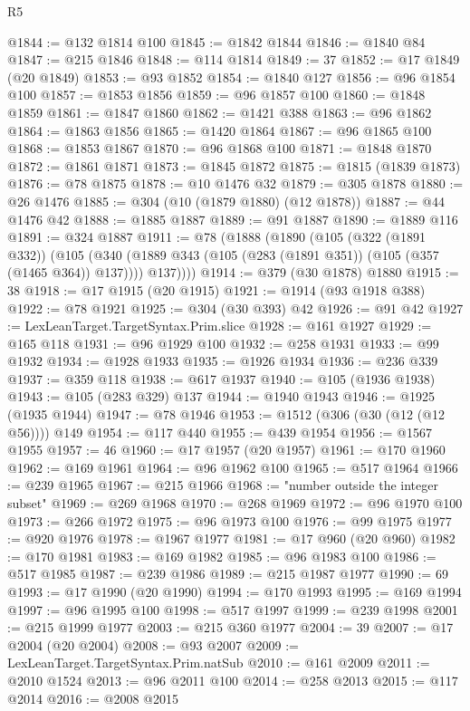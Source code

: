 \begin{lexlean}{R5}
\begin{coremodule}
@1844 := @132 @1814 @100
@1845 := @1842 @1844
@1846 := @1840 @84
@1847 := @215 @1846
@1848 := @114 @1814
@1849 := 37
@1852 := @17 @1849 (@20 @1849)
@1853 := @93 @1852
@1854 := @1840 @127
@1856 := @96 @1854 @100
@1857 := @1853 @1856
@1859 := @96 @1857 @100
@1860 := @1848 @1859
@1861 := @1847 @1860
@1862 := @1421 @388
@1863 := @96 @1862
@1864 := @1863 @1856
@1865 := @1420 @1864
@1867 := @96 @1865 @100
@1868 := @1853 @1867
@1870 := @96 @1868 @100
@1871 := @1848 @1870
@1872 := @1861 @1871
@1873 := @1845 @1872
@1875 := @1815 (@1839 @1873)
@1876 := @78 @1875
@1878 := @10 @1476 @32
@1879 := @305 @1878
@1880 := @26 @1476
@1885 := @304 (@10 (@1879 @1880) (@12 @1878))
@1887 := @44 @1476 @42
@1888 := @1885 @1887
@1889 := @91 @1887
@1890 := @1889 @116
@1891 := @324 @1887
@1911 := @78
    (@1888
      (@1890
        (@105
          (@322 (@1891 @332))
          (@105
            (@340 (@1889 @343 (@105 (@283 (@1891 @351)) (@105 (@357 (@1465 @364)) @137))))
            @137))))
@1914 := @379 (@30 @1878) @1880
@1915 := 38
@1918 := @17 @1915 (@20 @1915)
@1921 := @1914 (@93 @1918 @388)
@1922 := @78 @1921
@1925 := @304 (@30 @393) @42
@1926 := @91 @42
@1927 := LexLeanTarget.TargetSyntax.Prim.slice
@1928 := @161 @1927
@1929 := @165 @118
@1931 := @96 @1929 @100
@1932 := @258 @1931
@1933 := @99 @1932
@1934 := @1928 @1933
@1935 := @1926 @1934
@1936 := @236 @339
@1937 := @359 @118
@1938 := @617 @1937
@1940 := @105 (@1936 @1938)
@1943 := @105 (@283 @329) @137
@1944 := @1940 @1943
@1946 := @1925 (@1935 @1944)
@1947 := @78 @1946
@1953 := @1512 (@306 (@30 (@12 (@12 @56)))) @149
@1954 := @117 @440
@1955 := @439 @1954
@1956 := @1567 @1955
@1957 := 46
@1960 := @17 @1957 (@20 @1957)
@1961 := @170 @1960
@1962 := @169 @1961
@1964 := @96 @1962 @100
@1965 := @517 @1964
@1966 := @239 @1965
@1967 := @215 @1966
@1968 := "number outside the integer subset"
@1969 := @269 @1968
@1970 := @268 @1969
@1972 := @96 @1970 @100
@1973 := @266 @1972
@1975 := @96 @1973 @100
@1976 := @99 @1975
@1977 := @920 @1976
@1978 := @1967 @1977
@1981 := @17 @960 (@20 @960)
@1982 := @170 @1981
@1983 := @169 @1982
@1985 := @96 @1983 @100
@1986 := @517 @1985
@1987 := @239 @1986
@1989 := @215 @1987 @1977
@1990 := 69
@1993 := @17 @1990 (@20 @1990)
@1994 := @170 @1993
@1995 := @169 @1994
@1997 := @96 @1995 @100
@1998 := @517 @1997
@1999 := @239 @1998
@2001 := @215 @1999 @1977
@2003 := @215 @360 @1977
@2004 := 39
@2007 := @17 @2004 (@20 @2004)
@2008 := @93 @2007
@2009 := LexLeanTarget.TargetSyntax.Prim.natSub
@2010 := @161 @2009
@2011 := @2010 @1524
@2013 := @96 @2011 @100
@2014 := @258 @2013
@2015 := @117 @2014
@2016 := @2008 @2015

\end{coremodule}
\end{lexlean}
